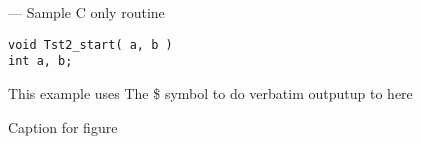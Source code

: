 \startmanpage
{}
--- Sample C only routine 
\startvb\begin{verbatim}
void Tst2_start( a, b )
int a, b;
\end{verbatim}
\endvb
This example uses
\linebreak   The \$ symbol to do verbatim output\linebreak   up to here
\par
\centerline{}\begin{center}\bf
\par
Caption for figure
\end{center}
\par
\par
\par
{}
\endmanpage
